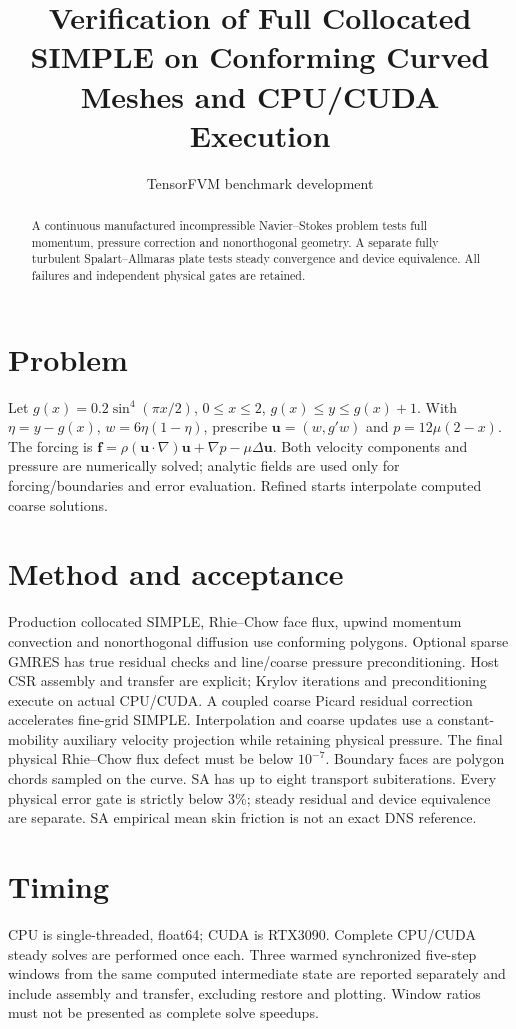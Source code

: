 \documentclass[11pt]{article}
\title{Verification of Full Collocated SIMPLE on Conforming Curved Meshes and CPU/CUDA Execution}
\author{TensorFVM benchmark development}
\begin{document}
\maketitle
\begin{abstract}
A continuous manufactured incompressible Navier--Stokes problem tests full momentum, pressure correction and nonorthogonal geometry. A separate fully turbulent Spalart--Allmaras plate tests steady convergence and device equivalence. All failures and independent physical gates are retained.
\end{abstract}
\section{Problem}
Let $g(x)=0.2\sin^4(\pi x/2)$, $0\leq x\leq2$, $g(x)\leq y\leq g(x)+1$.
With $\eta=y-g(x)$, $w=6\eta(1-\eta)$, prescribe
$\mathbf{u}=(w,g'w)$ and $p=12\mu(2-x)$.
The forcing is $\mathbf{f}=\rho(\mathbf{u}\cdot\nabla)\mathbf{u}+\nabla p-\mu\Delta\mathbf{u}$.
Both velocity components and pressure are numerically solved; analytic fields are used only for forcing/boundaries and error evaluation. Refined starts interpolate computed coarse solutions.
\section{Method and acceptance}
Production collocated SIMPLE, Rhie--Chow face flux, upwind momentum convection and nonorthogonal diffusion use conforming polygons. Optional sparse GMRES has true residual checks and line/coarse pressure preconditioning. Host CSR assembly and transfer are explicit; Krylov iterations and preconditioning execute on actual CPU/CUDA. A coupled coarse Picard residual correction accelerates fine-grid SIMPLE. Interpolation and coarse updates use a constant-mobility auxiliary velocity projection while retaining physical pressure. The final physical Rhie--Chow flux defect must be below $10^{-7}$. Boundary faces are polygon chords sampled on the curve. SA has up to eight transport subiterations. Every physical error gate is strictly below 3\%; steady residual and device equivalence are separate. SA empirical mean skin friction is not an exact DNS reference.
\section{Timing}
CPU is single-threaded, float64; CUDA is RTX3090. Complete CPU/CUDA steady solves are performed once each. Three warmed synchronized five-step windows from the same computed intermediate state are reported separately and include assembly and transfer, excluding restore and plotting. Window ratios must not be presented as complete solve speedups.
\end{document}
